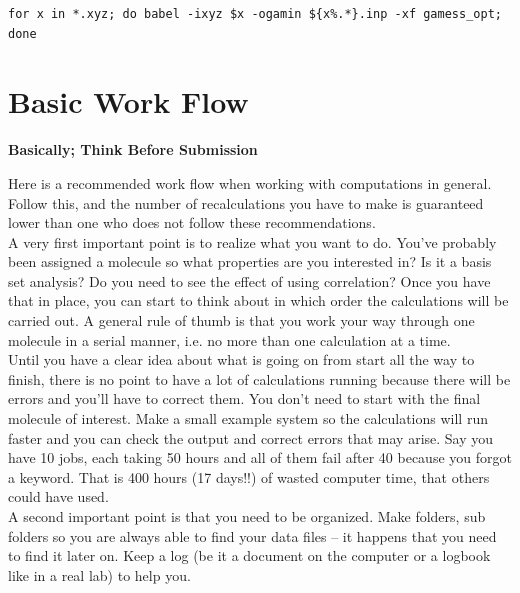 \documentclass{article}
\begin{document}
\begin{lstlisting}
for x in *.xyz; do babel -ixyz $x -ogamin ${x%.*}.inp -xf gamess_opt; done
\end{lstlisting}

\newpage
\section{Basic Work Flow}

\begin{center}
\bf Basically; Think Before Submission
\end{center}



Here is a recommended work flow when working with computations in general.
Follow this, and the number of recalculations you have to make is guaranteed lower than one who does not follow these recommendations.\\

A very first important point is to realize what you want to do.
You've probably been assigned a molecule so what properties are you interested in?
Is it a basis set analysis?
Do you need to see the effect of using correlation?
Once you have that in place, you can start to think about in which order the calculations will be carried out.
A general rule of thumb is that you work your way through one molecule in a serial manner, i.e. no more than one calculation at a time.\\

Until you have a clear idea about what is going on from start all the way to finish, there is no point to have a lot of calculations running because there will be errors and you'll have to correct them.
You don't need to start with the final molecule of interest.
Make a small example system so the calculations will run faster and you can check the output and correct errors that may arise.
Say you have 10 jobs, each taking 50 hours and all of them fail after 40 because you forgot a keyword.
That is 400 hours (17 days!!) of wasted computer time, that others could have used.\\

A second important point is that you need to be organized.
Make folders, sub folders so you are always able to find your data files – it happens that you need to find it later on.
Keep a log (be it a document on the computer or a logbook like in a real lab) to help you.\\
\end{document}
